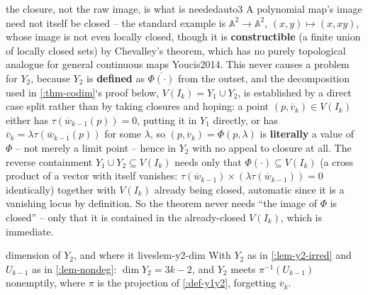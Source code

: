 \documentclass[a4paper,11pt]{scrartcl}
\begin{document}
\begin{remark}{the closure, not the raw image, is what is needed}{auto3} A polynomial map's image need not itself be closed -- the standard example is \(\mathbb{A}^{2} \rightarrow \mathbb{A}^{2}\), \((x,y) \mapsto (x,xy)\), whose image is not even locally closed, though it is \textbf{constructible} (a finite union of locally closed sets) by Chevalley's theorem, which has no purely topological analogue for general continuous maps Youcis2014. This never causes a problem for \(Y_{2}\), because \(Y_{2}\) is \textbf{defined} as \(\overline{\Phi( \cdot )}\) from the outset, and the decomposition used in \cref{:thm-codim}`s proof below, \(V\left( I_{k} \right) = Y_{1} \cup Y_{2}\), is established by a direct case split rather than by taking closures and hoping: a point \(\left( p,{\overline{v}}_{k} \right) \in V\left( I_{k} \right)\) either has \(\tau({\overline{w}}_{k - 1}(p)) = 0\), putting it in \(Y_{1}\) directly, or has \({\overline{v}}_{k} = \lambda\tau({\overline{w}}_{k - 1}(p))\) for some \(\lambda\), so \(\left( p,{\overline{v}}_{k} \right) = \Phi(p,\lambda)\) is \textbf{literally} a value of \(\Phi\) -- not merely a limit point -- hence in \(Y_{2}\) with no appeal to closure at all. The reverse containment \(Y_{1} \cup Y_{2} \subseteq V\left( I_{k} \right)\) needs only that \(\Phi( \cdot ) \subseteq V\left( I_{k} \right)\) (a cross product of a vector with itself vanishes: \(\tau({\overline{w}}_{k - 1}) \times \left( \lambda\tau({\overline{w}}_{k - 1}) \right) = 0\) identically) together with \(V\left( I_{k} \right)\) already being closed, automatic since it is a vanishing locus by definition. So the theorem never needs ``the image of \(\Phi\) is closed'' -- only that it is contained in the already-closed \(V\left( I_{k} \right)\), which is immediate.

\end{remark} \protect{}\label{rem-closure-suffices}{}

\begin{lemma}{dimension of \(Y_{2}\), and where it lives}{lem-y2-dim} With \(Y_{2}\) as in \cref{:lem-y2-irred} and \(U_{k - 1}\) as in \cref{:lem-nondeg}: \(\dim Y_{2} = 3k - 2\), and \(Y_{2}\) meets \(\pi^{- 1}\left( U_{k - 1} \right)\) nonemptily, where \(\pi\) is the projection of \cref{:def-y1y2}, forgetting \({\overline{v}}_{k}\).

\end{lemma} \protect{}\label{lem-y2-dim}{}
\end{document}
